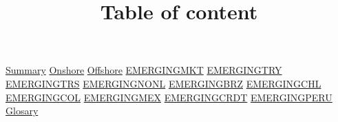 \documentclass{article}
\title{Table of content}
\begin{document}
\maketitle
\hyperlink{page.2}{Summary}
\hyperlink{page.3}{Onshore}
\hyperlink{page.4}{Offshore}
\hyperlink{page.5}{EMERGINGMKT}
\hyperlink{page.6}{EMERGINGTRY}
\hyperlink{page.7}{EMERGINGTRS}
\hyperlink{page.8}{EMERGINGNONL}
\hyperlink{page.9}{EMERGINGBRZ}
\hyperlink{page.10}{EMERGINGCHL}
\hyperlink{page.11}{EMERGINGCOL}
\hyperlink{page.12}{EMERGINGMEX}
\hyperlink{page.13}{EMERGINGCRDT}
\hyperlink{page.14}{EMERGINGPERU}
\hyperlink{page.15}{Glosary}


\end{document}
